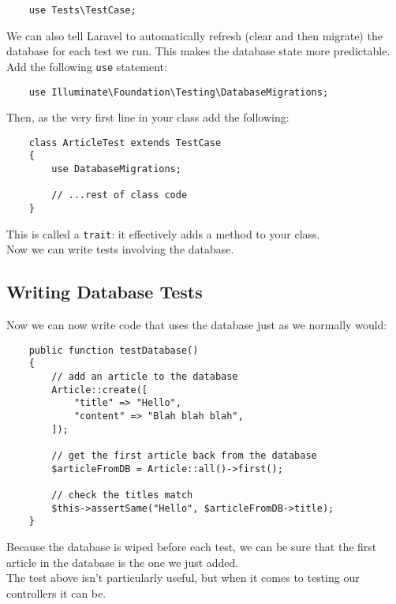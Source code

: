 \begin{verbatim}
    use Tests\TestCase;
\end{verbatim}

We can also tell Laravel to automatically refresh (clear and then migrate) the database for each test we run. This makes the database state more predictable.
\\

Add the following \texttt{use} statement:

\begin{verbatim}
    use Illuminate\Foundation\Testing\DatabaseMigrations;
\end{verbatim}

Then, as the very first line in your class add the following:

\begin{verbatim}
    class ArticleTest extends TestCase
    {
        use DatabaseMigrations;

        // ...rest of class code
    }
\end{verbatim}

This is called a \texttt{trait}: it effectively adds a method to your class.
\\

Now we can write tests involving the database.


\subsection{Writing Database Tests}

Now we can now write code that uses the database just as we normally would:

\begin{verbatim}
    public function testDatabase()
    {
        // add an article to the database
        Article::create([
            "title" => "Hello",
            "content" => "Blah blah blah",
        ]);

        // get the first article back from the database
        $articleFromDB = Article::all()->first();

        // check the titles match
        $this->assertSame("Hello", $articleFromDB->title);
    }
\end{verbatim}

Because the database is wiped before each test, we can be sure that the first article in the database is the one we just added.
\\

The test above isn't particularly useful, but when it comes to testing our controllers it can be.


